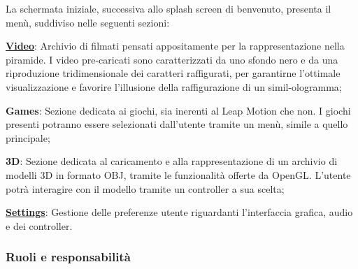 La schermata iniziale, successiva allo splash screen di benvenuto, presenta il menù, suddiviso nelle seguenti sezioni\+:
\begin{DoxyItemize}
\item {\bfseries \hyperlink{classVideo}{Video}}\+: Archivio di filmati pensati appositamente per la rappresentazione nella piramide. I video pre-\/caricati sono caratterizzati da uno sfondo nero e da una riproduzione tridimensionale dei caratteri raffigurati, per garantirne l’ottimale visualizzazione e favorire l’illusione della raffigurazione di un simil-\/ologramma;
\item {\bfseries Games}\+: Sezione dedicata ai giochi, sia inerenti al Leap Motion che non. I giochi presenti potranno essere selezionati dall’utente tramite un menù, simile a quello principale;
\item {\bfseries 3D}\+: Sezione dedicata al caricamento e alla rappresentazione di un archivio di modelli 3D in formato O\+BJ, tramite le funzionalità offerte da Open\+GL. L’utente potrà interagire con il modello tramite un controller a sua scelta;
\item {\bfseries \hyperlink{classSettings}{Settings}}\+: Gestione delle preferenze utente riguardanti l’interfaccia grafica, audio e dei controller.
\end{DoxyItemize}

\subsubsection*{Ruoli e responsabilità}


